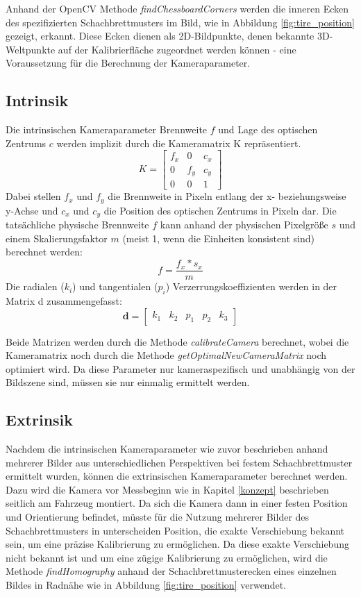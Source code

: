    Anhand der OpenCV Methode \textit{findChessboardCorners} werden die inneren Ecken des spezifizierten Schachbrettmusters im Bild, wie in Abbildung \ref{fig:tire_position} gezeigt, erkannt.
    Diese Ecken dienen als 2D-Bildpunkte, denen bekannte 3D-Weltpunkte auf der Kalibrierfläche zugeordnet werden können - eine Voraussetzung für die Berechnung der Kameraparameter.

    \subsection{Intrinsik}
        Die intrinsischen Kameraparameter Brennweite $f$ und Lage des optischen Zentrums $c$ werden implizit durch die Kameramatrix K repräsentiert.
        \[
        K = 
        \begin{bmatrix}
        f_x & 0 & c_x \\
        0 & f_y & c_y \\
        0 & 0 & 1
        \end{bmatrix}
        \]
        Dabei stellen $f_x$ und $f_y$ die Brennweite in Pixeln entlang der x- beziehungsweise y-Achse und $c_x$ und $c_y$ die Position des optischen Zentrums in Pixeln dar.
        Die tatsächliche physische Brennweite $f$ kann anhand der physischen Pixelgrö{\ss}e $s$ und einem Skalierungsfaktor $m$ (meist 1, wenn die Einheiten konsistent sind) berechnet werden:
        \[
            f = \frac{f_x * s_x}{m}
        \]
        Die radialen ($k_i$) und tangentialen ($p_i$) Verzerrungskoeffizienten werden in der Matrix d zusammengefasst:
        \[
        \mathbf{d} = 
        \begin{bmatrix}
        k_1 & k_2 & p_1 & p_2 & k_3
        \end{bmatrix}
        \]

        Beide Matrizen werden durch die Methode \textit{calibrateCamera} berechnet, wobei die Kameramatrix noch durch die Methode \textit{getOptimalNewCameraMatrix} noch optimiert wird.
        Da diese Parameter nur kameraspezifisch und unabhängig von der Bildszene sind, müssen sie nur einmalig ermittelt werden.

    \subsection{Extrinsik}
        Nachdem die intrinsischen Kameraparameter wie zuvor beschrieben anhand mehrerer Bilder aus unterschiedlichen Perspektiven bei festem Schachbrettmuster ermittelt wurden, können die extrinsischen Kameraparameter berechnet werden.
        Dazu wird die Kamera vor Messbeginn wie in Kapitel \ref{konzept} beschrieben seitlich am Fahrzeug montiert. Da sich die Kamera dann in einer festen Position und Orientierung befindet, müsste für die Nutzung mehrerer Bilder des Schachbrettmusters in unterscheiden Position, die exakte Verschiebung bekannt sein, um eine präzise Kalibrierung zu ermöglichen.
        Da diese exakte Verschiebung nicht bekannt ist und um eine zügige Kalibrierung zu ermöglichen, wird die Methode \textit{findHomography} anhand der Schachbrettmusterecken eines einzelnen Bildes in Radnähe wie in Abbildung \ref{fig:tire_position} verwendet. 

